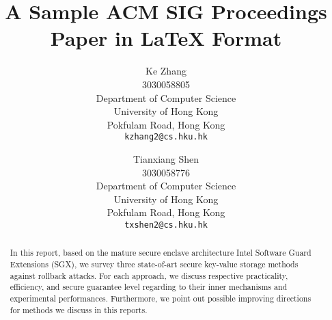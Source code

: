 \documentclass{acm_proc_article-csis8101}
\begin{document}
%

\title{A Sample {\ttlit ACM} SIG Proceedings Paper in LaTeX
Format}
%

\author{
Ke Zhang\\
3030058805\\
Department of Computer Science\\
University of Hong Kong \\
Pokfulam Road, Hong Kong\\
\texttt{kzhang2@cs.hku.hk}
\and Tianxiang Shen\\
3030058776\\
Department of Computer Science\\
University of Hong Kong \\
Pokfulam Road, Hong Kong \\
\texttt{txshen2@cs.hku.hk}
}

%
\maketitle
\begin{abstract}
In this report, based on the mature secure enclave architecture Intel Software Guard Extensions (SGX), we survey three state-of-art secure key-value storage methods against rollback attacks. For each approach, we discuss respective practicality, efficiency, and secure guarantee level regarding to their inner mechanisms and experimental performances. Furthermore, we point out possible improving directions for methods we discuss in this reports.

\end{abstract}







% 



%


\end{document}
